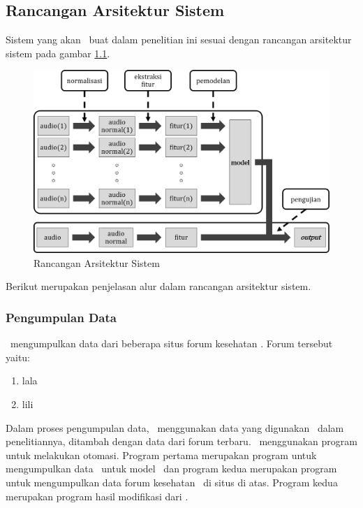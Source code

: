 \chapter{\babTiga}


\section{Rancangan Arsitektur Sistem}
Sistem yang akan \saya~buat dalam penelitian ini sesuai dengan rancangan arsitektur sistem pada gambar \ref{fig:arsitektur_sistem}.
\begin{figure}
  \centering
  \includegraphics[width=\linewidth]{pics/arsitektur_sistemc}
  \caption{Rancangan Arsitektur Sistem}
  \label{fig:arsitektur_sistem}
\end{figure}

Berikut merupakan penjelasan alur dalam rancangan arsitektur sistem.
	\subsection{Pengumpulan Data}
	\Saya~mengumpulkan data dari beberapa situs forum kesehatan \ioa. Forum tersebut yaitu:
	\begin{enumerate}
		\item lala
		\item lili
	\end{enumerate}
	Dalam proses pengumpulan data, \saya~menggunakan data yang digunakan \skripsiRadit~dalam penelitiannya, ditambah dengan data dari forum terbaru. \Saya~menggunakan program untuk melakukan otomasi. Program pertama merupakan program untuk mengumpulkan data \ioa~untuk model \we~dan program kedua merupakan program untuk mengumpulkan data forum kesehatan \ol~di situs di atas. Program kedua merupakan program hasil modifikasi dari \skripsiRadit.
	
